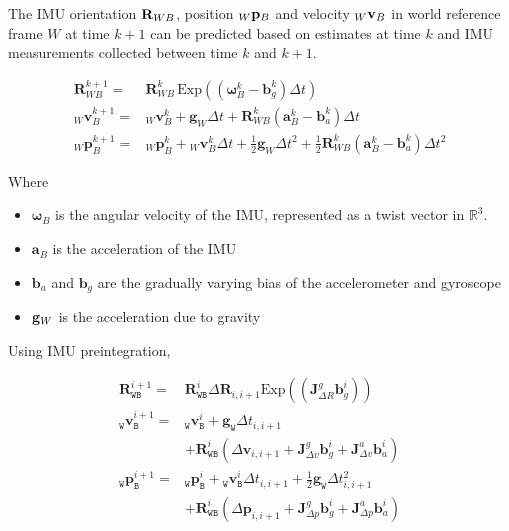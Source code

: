 The IMU orientation ${\bf R}_{WB}$, position ${_W}{\bf p}_{B}$ and velocity $_W{\bf v}_B$ in world reference frame $W$ at time $k+1$ can be predicted based on estimates at time $k$ and IMU measurements collected between time $k$ and $k+1$.

\begin{align} \mathbf {R}^{k+1}_{WB} = & \mathbf {R}^{k}_{WB} \, \text{Exp}\left(\left(\boldsymbol {\omega }^k_{B} - \boldsymbol {b}^k_g\right)\Delta t\right) \nonumber\\ _{W}\mathbf {v}^{k+1}_{B} = & {_{W}\mathbf {v}^{k}_{B}} + \mathbf {g}_{W} \Delta t + \mathbf {R}^{k}_{WB} \left(\boldsymbol {a}^k_{B} - \boldsymbol {b}^k_a\right)\Delta t \nonumber\\ _{W}\mathbf {p}^{k+1}_{B} = & {_{W}\mathbf {p}^{k}_{B}} + {_{W}\mathbf {v}^{k}_{B}} \Delta t + \frac{1}{2}\mathbf {g}_{W} \Delta t^2 + \frac{1}{2} \mathbf {R}^{k}_{WB} \left(\boldsymbol {a}^k_{B} - \boldsymbol {b}^k_a\right)\Delta t^2 \end{align}

Where
\begin{itemize}
	\item ${\boldsymbol \omega }_{B}$ is the angular velocity of the IMU, represented as a twist vector in $\mathbb{R}^3$. 
	\item $\boldsymbol {a}_{B}$ is the acceleration of the IMU
	\item $\boldsymbol{b}_a$ and $\boldsymbol {b}_g$ are the gradually varying bias of the accelerometer and gyroscope
	\item ${\bf g}_W$ is the acceleration due to gravity
\end{itemize}

Using IMU preintegration, 

\begin{align} \label{eq:imuslam1} \mathbf {R}^{i+1}_\mathtt {WB} = & \mathbf {R}^{i}_\mathtt {WB} \Delta \mathbf {R}_{i,i+1} \text{Exp}\left(\left(\mathbf {J}^g_{\Delta R}\mathbf {b}^i_g\right)\right) \nonumber\\ _\mathtt {W}\mathbf {v}^{i+1}_\mathtt {B} = & {_\mathtt {W}\mathbf {v}^{i}_\mathtt {B}} + \mathbf {g}_\mathtt {W} \Delta t_{i,i+1} \nonumber\\ &+ \mathbf {R}^{i}_\mathtt {WB} \left(\Delta \mathbf {v}_{i,i+1} + \mathbf {J}^g_{\Delta v} \mathbf {b}^i_g + \mathbf {J}^a_{\Delta v} \mathbf {b}^i_a\right) \nonumber\\ _\mathtt {W}\mathbf {p}^{i+1}_\mathtt {B} = & {_\mathtt {W}\mathbf {p}^{i}_\mathtt {B}} + {_\mathtt {W}\mathbf {v}^{i}_\mathtt {B}} \Delta t_{i,i+1} + \frac{1}{2}\mathbf {g}_\mathtt {W} \Delta t^2_{i,i+1} \nonumber\\ & + \mathbf {R}^{i}_\mathtt {WB} \left(\Delta \mathbf {p}_{i,i+1} + \mathbf {J}^g_{\Delta p} \mathbf {b}^i_g + \mathbf {J}^a_{\Delta p} \mathbf {b}^i_a\right) \end{align}

